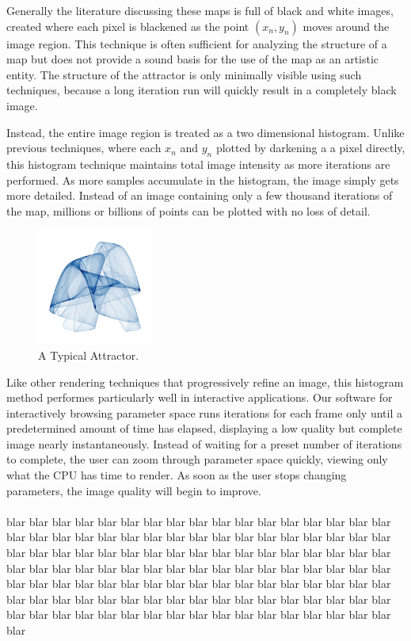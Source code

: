 \documentclass{acmsiggraph}
\begin{document}
Generally the literature discussing these maps is full of black and white
images, created where each pixel is blackened as the point $(x_n, y_n)$
moves around the image region. This technique is often sufficient for
analyzing the structure of a map but does not provide a sound basis for
the use of the map as an artistic entity. The structure of the attractor
is only minimally visible using such techniques, because a long iteration
run will quickly result in a completely black image.

Instead, the entire image region is treated as a two dimensional histogram.
Unlike previous techniques, where each $x_n$ and $y_n$ plotted by darkening a
a pixel directly, this histogram technique maintains total image intensity as
more iterations are performed. As more samples accumulate in the histogram,
the image simply gets more detailed. Instead of an image containing only a
few thousand iterations of the map, millions or billions of points can be
plotted with no loss of detail.

\begin{figure}[ht]
\centering
\includegraphics[width=1.5in]{1.png}
\caption{A Typical Attractor.}
\end{figure}

Like other rendering techniques that progressively refine an image, this
histogram method performes particularly well in interactive applications.
Our software for interactively browsing parameter space runs iterations
for each frame only until a predetermined amount of time has elapsed,
displaying a low quality but complete image nearly instantaneously.
Instead of waiting for a preset number of iterations to complete, the user
can zoom through parameter space quickly, viewing only what the CPU has time
to render. As soon as the user stops changing parameters, the image quality
will begin to improve.


\paragraph*{}
blar blar blar blar blar blar blar blar blar blar blar blar blar blar blar
blar blar blar blar blar blar blar blar blar blar blar blar blar blar blar
blar blar blar blar blar blar blar blar blar blar blar blar blar blar blar
blar blar blar blar blar blar blar blar blar blar blar blar blar blar blar
blar blar blar blar blar blar blar blar blar blar blar blar blar blar blar
blar blar blar blar blar blar blar blar blar blar blar blar blar blar blar
blar blar blar blar blar blar blar blar blar blar blar blar blar blar blar
blar blar blar blar blar blar blar blar blar blar blar blar blar blar blar
\end{document}
